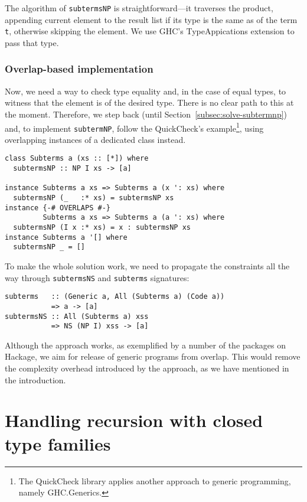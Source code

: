 \documentclass[runningheads]{llncs}
\newcommand{\K}[1]{\lstinline{#1}}
\begin{document}
The algorithm of \K{subtermsNP} is straightforward---it traverses the product, appending current element to the result list if its type is the same as of the term \K{t}, otherwise skipping the element. We use GHC's \textsf{TypeAppications} extension to pass that type.

\subsubsection{Overlap-based implementation}

Now, we need a way to check type equality and, in the case of equal types, to witness that the element is of the desired type. There is no clear path to this at the moment. Therefore, we step back (until Section~\ref{subsec:solve-subtermnp}) and, to implement \K{subtermNP}, follow the \textsf{QuickCheck}'s example\footnote{The \textsf{QuickCheck} library applies another approach to generic programming, namely \textsf{GHC.Generics}.}, using overlapping instances of a dedicated class instead.
\begin{lstlisting}
class Subterms a (xs :: [*]) where
  subtermsNP :: NP I xs -> [a]

instance Subterms a xs => Subterms a (x ': xs) where
  subtermsNP (_   :* xs) = subtermsNP xs
instance {-# OVERLAPS #-}
         Subterms a xs => Subterms a (a ': xs) where
  subtermsNP (I x :* xs) = x : subtermsNP xs
instance Subterms a '[] where
  subtermsNP _ = []
\end{lstlisting}

To make the whole solution work, we need to propagate the constraints all the way through \K{subtermsNS} and \K{subterms} signatures:
\begin{lstlisting}
subterms   :: (Generic a, All (Subterms a) (Code a))
           => a -> [a]
subtermsNS :: All (Subterms a) xss
           => NS (NP I) xss -> [a]
\end{lstlisting}

Although the approach works, as exemplified by a number of the packages on Hackage, we aim for release of generic programs from overlap. This would remove the complexity overhead introduced by the approach, as we have mentioned in the introduction.


\section{Handling recursion with closed type families}
\label{sec:handling-recursion}
\end{document}

